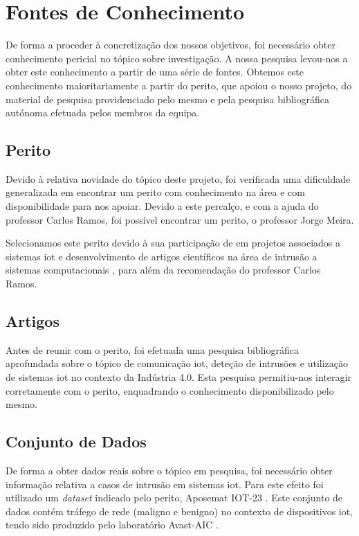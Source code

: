
\section{Fontes de Conhecimento}

De forma a proceder à concretização dos nossos objetivos, foi necessário obter conhecimento pericial no tópico sobre investigação. A nossa pesquisa levou-nos a obter este conhecimento a partir de uma série de fontes. Obtemos este conhecimento maioritariamente a partir do perito, que apoiou o nosso projeto, do material de pesquisa providenciado pelo mesmo e pela pesquisa bibliográfica autónoma efetuada pelos membros da equipa.

\subsection{Perito}

Devido à relativa novidade do tópico deste projeto, foi verificada uma dificuldade generalizada em encontrar um perito com conhecimento na área e com disponibilidade para nos apoiar. Devido a este percalço, e com a ajuda do professor Carlos Ramos, foi possível encontrar um perito, o professor Jorge Meira.

Selecionamos este perito devido à sua participação de em projetos associados a sistemas \acrshort{iot} e desenvolvimento de artigos científicos na área de intrusão a sistemas computacionais \parencite{meira2017}, para além da recomendação do professor Carlos Ramos.

\subsection{Artigos}

Antes de reunir com o perito, foi efetuada uma pesquisa bibliográfica aprofundada sobre o tópico de comunicação \acrshort{iot}, deteção de intrusões e utilização de sistemas \acrshort{iot} no contexto da Indústria 4.0. Esta pesquisa permitiu-nos interagir corretamente com o perito, enquadrando o conhecimento disponibilizado pelo mesmo.

\subsection{Conjunto de Dados}
\label{sec:dataset}

De forma a obter dados reais sobre o tópico em pesquisa, foi necessário obter informação relativa a casos de intrusão em sistemas \acrshort{iot}. Para este efeito foi utilizado um \textit{dataset} indicado pelo perito, Aposemat IOT-23 \parencite{sebastian_garcia_2020_4743746}. Este conjunto de dados contém tráfego de rede (maligno e benigno) no contexto de dispositivos \acrshort{iot}, tendo sido produzido pelo laboratório Avast-AIC \parencite{sebastian_garcia_2020_4743746}.